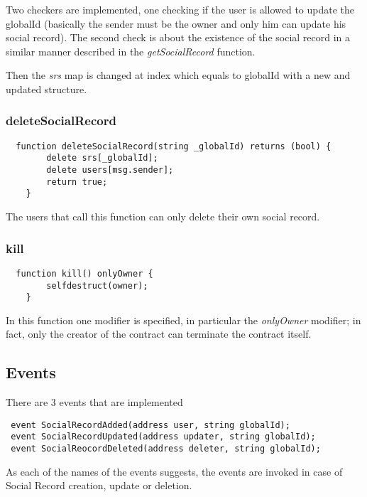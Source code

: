 Two checkers are implemented, one checking if the user is allowed to update the globalId (basically the sender must be the owner and only him can update his social record).
The second check is about the existence of the social record in a similar manner described  in the \textit{getSocialRecord} function.

Then the \textit{srs} map is changed at index which equals to globalId with a new and updated structure.

\subsubsection{deleteSocialRecord}
\begin{lstlisting}
  function deleteSocialRecord(string _globalId) returns (bool) {
        delete srs[_globalId];
        delete users[msg.sender];
        return true;
    }
\end{lstlisting}
The users that call this function can only delete their own social record.

\subsubsection{kill}
\begin{lstlisting}
  function kill() onlyOwner {
        selfdestruct(owner);
    }
\end{lstlisting}
In this function one modifier is specified, in particular the \textit{onlyOwner} modifier; in fact, only the creator of the contract can terminate the contract itself. 

\subsection{Events}
There are 3 events that are implemented
\begin{lstlisting}
 event SocialRecordAdded(address user, string globalId);
 event SocialRecordUpdated(address updater, string globalId);
 event SocialReocordDeleted(address deleter, string globalId);
\end{lstlisting}
As each of the names of the events suggests, the events are invoked in case of Social Record creation, update or deletion.

